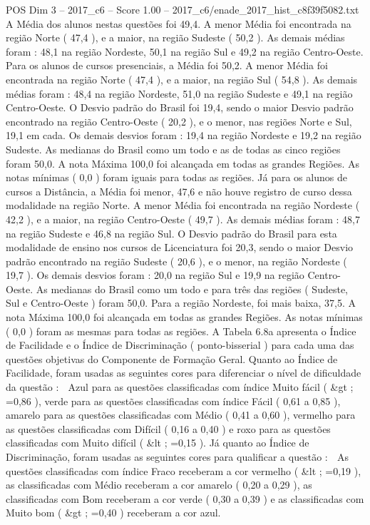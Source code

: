 \begin{textsample}{POS Dim 3 – 2017\_c6 – Score 1.00 – 2017\_c6/enade\_2017\_hist\_c8f39f5082.txt}
A Média dos alunos nestas questões foi 49,4.
A menor Média foi encontrada na região Norte ( 47,4 ), e a maior, na região Sudeste ( 50,2 ).
As demais médias foram : 48,1 na região Nordeste, 50,1 na região Sul e 49,2 na região Centro-Oeste.
Para os alunos de cursos presenciais, a Média foi 50,2.
A menor Média foi encontrada na região Norte ( 47,4 ), e a maior, na região Sul ( 54,8 ).
As demais médias foram : 48,4 na região Nordeste, 51,0 na região Sudeste e 49,1 na região Centro-Oeste.
O Desvio padrão do Brasil foi 19,4, sendo o maior Desvio padrão encontrado na região Centro-Oeste ( 20,2 ), e o menor, nas regiões Norte e Sul, 19,1 em cada.
Os demais desvios foram : 19,4 na região Nordeste e 19,2 na região Sudeste.
As medianas do Brasil como um todo e as de todas as cinco regiões foram 50,0.
A nota Máxima 100,0 foi alcançada em todas as grandes Regiões.
As notas mínimas ( 0,0 ) foram iguais para todas as regiões.
Já para os alunos de cursos a Distância, a Média foi menor, 47,6 e não houve registro de curso dessa modalidade na região Norte.
A menor Média foi encontrada na região Nordeste ( 42,2 ), e a maior, na região Centro-Oeste ( 49,7 ).
As demais médias foram : 48,7 na região Sudeste e 46,8 na região Sul.
O Desvio padrão do Brasil para esta modalidade de ensino nos cursos de Licenciatura foi 20,3, sendo o maior Desvio padrão encontrado na região Sudeste ( 20,6 ), e o menor, na região Nordeste ( 19,7 ).
Os demais desvios foram : 20,0 na região Sul e 19,9 na região Centro-Oeste.
As medianas do Brasil como um todo e para três das regiões ( Sudeste, Sul e Centro-Oeste ) foram 50,0.
Para a região Nordeste, foi mais baixa, 37,5.
A nota Máxima 100,0 foi alcançada em todas as grandes Regiões.
As notas mínimas ( 0,0 ) foram as mesmas para todas as regiões.
A Tabela 6.8a apresenta o Índice de Facilidade e o Índice de Discriminação ( ponto-bisserial ) para cada uma das questões objetivas do Componente de Formação Geral.
Quanto ao Índice de Facilidade, foram usadas as seguintes cores para diferenciar o nível de dificuldade da questão :  Azul para as questões classificadas com índice Muito fácil ( \&gt ; =0,86 ), verde para as questões classificadas com índice Fácil ( 0,61 a 0,85 ), amarelo para as questões classificadas com Médio ( 0,41 a 0,60 ), vermelho para as questões classificadas com Difícil ( 0,16 a 0,40 ) e roxo para as questões classificadas com Muito difícil ( \&lt ; =0,15 ).
Já quanto ao Índice de Discriminação, foram usadas as seguintes cores para qualificar a questão :  As questões classificadas com índice Fraco receberam a cor vermelho ( \&lt ; =0,19 ), as classificadas com Médio receberam a cor amarelo ( 0,20 a 0,29 ), as classificadas com Bom receberam a cor verde ( 0,30 a 0,39 ) e as classificadas com Muito bom ( \&gt ; =0,40 ) receberam a cor azul.

\end{textsample}
